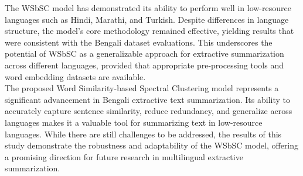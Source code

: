 The WSbSC model has demonstrated its ability to perform well in low-resource languages
such as Hindi, Marathi, and Turkish.
Despite differences in language structure, the model’s core methodology remained effective,
yielding results that were consistent with the Bengali dataset evaluations.
This underscores the potential of WSbSC as a generalizable approach
for extractive summarization across different languages, provided that
appropriate pre-processing tools and word embedding datasets are available.\\

The proposed Word Similarity-based Spectral Clustering model represents a
significant advancement in Bengali extractive text summarization.
Its ability to accurately capture sentence similarity, reduce redundancy, and generalize
across languages makes it a valuable tool for summarizing text in low-resource languages.
While there are still challenges to be addressed, the results of this study demonstrate the
robustness and adaptability of the WSbSC model, offering a promising direction for future research
in multilingual extractive summarization.
